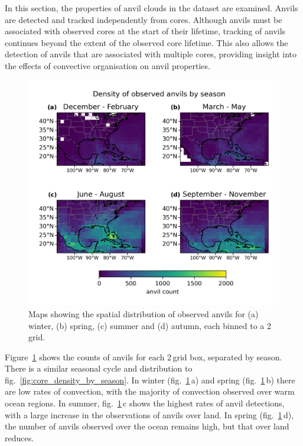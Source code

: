 In this section, the properties of anvil clouds in the dataset are examined.
Anvils are detected and tracked independently from cores.
Although anvils must be associated with observed cores at the start of their lifetime, tracking of anvils continues beyond the extent of the observed core lifetime.
This also allows the detection of anvils that are associated with multiple cores, providing insight into the effects of convective organisation on anvil properties.

\begin{figure}[tp]
    \centering
    \includegraphics[width=\textwidth]{figures/chapter2_16.png}
    \caption[
    Maps showing the spatial distribution of observed anvils by season
    ]{
    Maps showing the spatial distribution of observed anvils for (a) winter, (b) spring, (c) summer and (d) autumn, each binned to a 2\,\textdegree grid.
    }
    \label{fig:anvil_distribution_map}
\end{figure}

Figure~\ref{fig:anvil_distribution_map} shows the counts of anvils for each 2\,\textdegree grid box, separated by season.
There is a similar seasonal cycle and distribution to fig.~\ref{fig:core_density_by_season}.
In winter (fig.~\ref{fig:anvil_distribution_map}\,a) and spring (fig.~\ref{fig:anvil_distribution_map}\,b) there are low rates of convection, with the majority of convection observed over warm ocean regions.
In summer, fig.~\ref{fig:anvil_distribution_map}\,c shows the highest rates of anvil detections, with a large increase in the observations of anvils over land.
In spring (fig.~\ref{fig:anvil_distribution_map}\,d), the number of anvils observed over the ocean remains high, but that over land reduces.


